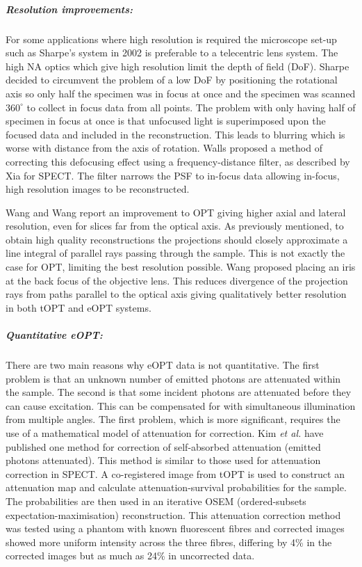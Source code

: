 \documentclass[12pt]{article}
\begin{document}
\subparagraph{Resolution improvements:}
For some applications where high resolution is required the microscope set-up  such as Sharpe's system in 2002 is preferable to a telecentric lens system. The high NA optics which give high resolution limit the depth of field (DoF). Sharpe decided to circumvent the problem of a low DoF by positioning the rotational axis so only half the specimen was in focus at once and the specimen was scanned $360^{\circ}$ to collect in focus data from all points. 
The problem with only having half of specimen in focus at once is that unfocused light is superimposed upon the focused data and included in the reconstruction. This leads to blurring which is worse with distance from the axis of rotation. Walls proposed a method of correcting this defocusing effect using a frequency-distance filter, as described by Xia for SPECT. \cite{xia1995fourier,Walls:2007jl} The filter narrows the PSF to in-focus data allowing in-focus, high resolution images to be reconstructed. \cite{Walls:2007jl}

Wang and Wang report an improvement to OPT giving higher axial and lateral resolution, even for slices far from the optical axis. \cite{Wang:2006hy, Wang:2007} As previously mentioned, to obtain high quality reconstructions the projections should closely approximate a line integral of parallel rays passing through the sample. \cite{Wang:2006hy} This is not exactly the case for  OPT, limiting the best resolution possible. Wang proposed placing an iris at the back focus of the objective lens. This reduces divergence of the projection rays from paths parallel to the optical axis giving qualitatively better resolution in both tOPT and eOPT systems. 


\subparagraph{Quantitative eOPT:} 
There are two main reasons why eOPT data is not quantitative. The first problem is that an unknown number of emitted photons are attenuated within the sample. The second is that some incident photons are attenuated before they can cause excitation. \cite{Kim:2008eua} This can be compensated for with simultaneous illumination from multiple angles. The first problem, which is more significant, requires the use of a mathematical model of attenuation for correction. Kim \textit{et al.} have published one method for correction of self-absorbed attenuation (emitted photons attenuated). \cite{Kim:2008eua} This method is similar to those used for attenuation correction in SPECT. A co-registered image from tOPT is used to construct an attenuation map and calculate attenuation-survival probabilities for the sample. The probabilities are then used in an iterative OSEM (ordered-subsets expectation-maximisation) reconstruction. \cite{Kim:2008eua, hudson1994accelerated} This attenuation correction method was tested using a  phantom with known fluorescent fibres and corrected images showed more uniform intensity across the three fibres, differing by 4\% in the corrected images but as much as 24\% in uncorrected data. \cite{Kim:2008eua}
\end{document}
